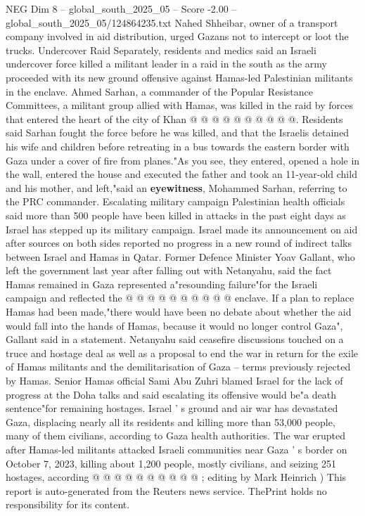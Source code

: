 \begin{textsample}{NEG Dim 8 – global\_south\_2025\_05 – Score -2.00 – global\_south\_2025\_05/124864235.txt}
Nahed Shheibar, owner of a transport company involved in aid distribution, urged Gazans not to intercept or loot the trucks.
Undercover Raid Separately, residents and medics said an Israeli undercover force killed a militant leader in a raid in the south as the army proceeded with its new ground offensive against Hamas-led Palestinian militants in the enclave.
Ahmed Sarhan, a commander of the Popular Resistance Committees, a militant group allied with Hamas, was killed in the raid by forces that entered the heart of the city of Khan @ @ @ @ @ @ @ @ @ @.
Residents said Sarhan fought the force before he was killed, and that the Israelis detained his wife and children before retreating in a bus towards the eastern border with Gaza under a cover of fire from planes."As you see, they entered, opened a hole in the wall, entered the house and executed the father and took an 11-year-old child and his mother, and left,"said an \textbf{eyewitness}, Mohammed Sarhan, referring to the PRC commander.
Escalating military campaign Palestinian health officials said more than 500 people have been killed in attacks in the past eight days as Israel has stepped up its military campaign.
Israel made its announcement on aid after sources on both sides reported no progress in a new round of indirect talks between Israel and Hamas in Qatar.
Former Defence Minister Yoav Gallant, who left the government last year after falling out with Netanyahu, said the fact Hamas remained in Gaza represented a"resounding failure"for the Israeli campaign and reflected the @ @ @ @ @ @ @ @ @ @ enclave.
If a plan to replace Hamas had been made,"there would have been no debate about whether the aid would fall into the hands of Hamas, because it would no longer control Gaza", Gallant said in a statement.
Netanyahu said ceasefire discussions touched on a truce and hostage deal as well as a proposal to end the war in return for the exile of Hamas militants and the demilitarisation of Gaza -- terms previously rejected by Hamas.
Senior Hamas official Sami Abu Zuhri blamed Israel for the lack of progress at the Doha talks and said escalating its offensive would be"a death sentence"for remaining hostages.
Israel ' s ground and air war has devastated Gaza, displacing nearly all its residents and killing more than 53,000 people, many of them civilians, according to Gaza health authorities.
The war erupted after Hamas-led militants attacked Israeli communities near Gaza ' s border on October 7, 2023, killing about 1,200 people, mostly civilians, and seizing 251 hostages, according @ @ @ @ @ @ @ @ @ @ ; editing by Mark Heinrich ) This report is auto-generated from the Reuters news service.
ThePrint holds no responsibility for its content.

\end{textsample}
